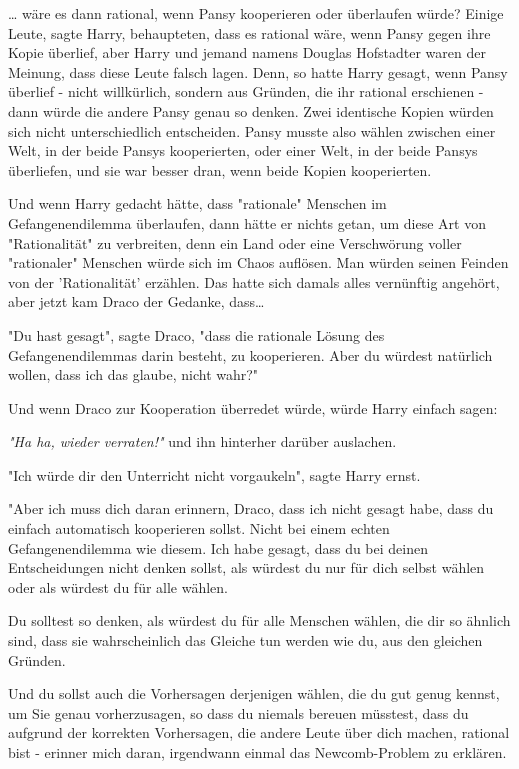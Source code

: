 {… wäre es dann rational, wenn Pansy kooperieren oder überlaufen würde? Einige Leute, sagte Harry, behaupteten, dass es rational wäre, wenn Pansy gegen ihre Kopie überlief, aber Harry und jemand namens Douglas Hofstadter waren der Meinung, dass diese Leute falsch lagen. Denn, so hatte Harry gesagt, wenn Pansy überlief - nicht willkürlich, sondern aus Gründen, die ihr rational erschienen - dann würde die andere Pansy genau so denken. Zwei identische Kopien würden sich nicht unterschiedlich entscheiden. Pansy musste also wählen zwischen einer Welt, in der beide Pansys kooperierten, oder einer Welt, in der beide Pansys überliefen, und sie war besser dran, wenn beide Kopien kooperierten.

Und wenn Harry gedacht hätte, dass "rationale" Menschen im Gefangenendilemma überlaufen, dann hätte er nichts getan, um diese Art von "Rationalität" zu verbreiten, denn ein Land oder eine Verschwörung voller "rationaler" Menschen würde sich im Chaos auflösen. Man würden seinen Feinden von der 'Rationalität' erzählen. Das hatte sich damals alles vernünftig angehört, aber jetzt kam Draco der Gedanke, dass…

"Du hast gesagt", sagte Draco, "dass die rationale Lösung des Gefangenendilemmas darin besteht, zu kooperieren. Aber du würdest natürlich wollen, dass ich das glaube, nicht wahr?"

Und wenn Draco zur Kooperation überredet würde, würde Harry einfach sagen:

\emph{"Ha ha, wieder verraten!"} und ihn hinterher darüber auslachen.

"Ich würde dir den Unterricht nicht vorgaukeln", sagte Harry ernst.

"Aber ich muss dich daran erinnern, Draco, dass ich nicht gesagt habe, dass du einfach automatisch kooperieren sollst. Nicht bei einem echten Gefangenendilemma wie diesem. Ich habe gesagt, dass du bei deinen Entscheidungen nicht denken sollst, als würdest du nur für dich selbst wählen oder als würdest du für alle wählen.

Du solltest so denken, als würdest du für alle Menschen wählen, die dir so ähnlich sind, dass sie wahrscheinlich das Gleiche tun werden wie du, aus den gleichen Gründen.

Und du sollst auch die Vorhersagen derjenigen wählen, die du gut genug kennst, um Sie genau vorherzusagen, so dass du niemals bereuen müsstest, dass du aufgrund der korrekten Vorhersagen, die andere Leute über dich machen, rational bist - erinner mich daran, irgendwann einmal das Newcomb-Problem zu erklären.

}
